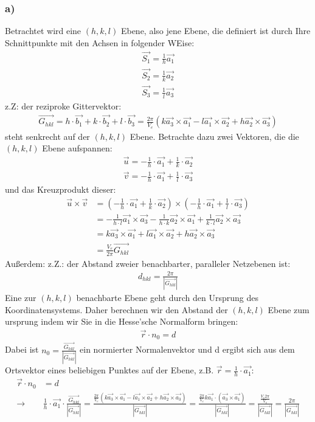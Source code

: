 \documentclass[11pt]{article}
\begin{document}
\subsubsection*{a)}
Betrachtet wird eine $(h,k,l)$ Ebene, also jene Ebene, die definiert ist durch Ihre Schnittpunkte mit den Achsen in folgender WEise:
\begin{align*}
\vec{S_1}=\frac{1}{h}\vec{a_1}\\
\vec{S_2}=\frac{1}{k}\vec{a_2}\\
\vec{S_3}=\frac{1}{l}\vec{a_3}
\end{align*}
z.Z: der reziproke Gittervektor:
\begin{align*}
\vec{G_{hkl}}=h\cdot\vec{b_1}+k\cdot\vec{b_2}+l\cdot\vec{b_3} = \frac{2\pi}{V_e}(k\vec{a_3}\times\vec{a_1}-l\vec{a_1}\times\vec{a_2}+h\vec{a_2}\times\vec{a_3})
\end{align*}
steht senkrecht auf der $(h,k,l)$ Ebene. Betrachte dazu zwei Vektoren, die die $(h,k,l)$ Ebene aufspannen:
\begin{align*}
\vec{u}=-\frac{1}{h}\cdot\vec{a_1}+\frac{1}{k}\cdot\vec{a_2}\\
\vec{v}=-\frac{1}{h}\cdot\vec{a_1}+\frac{1}{l}\cdot\vec{a_3}
\end{align*}
und das Kreuzprodukt dieser:
\begin{align*}
\vec{u}\times\vec{v} &= (-\frac{1}{h}\cdot\vec{a_1}+\frac{1}{k}\cdot\vec{a_2})\times(-\frac{1}{h}\cdot\vec{a_1}+\frac{1}{l}\cdot\vec{a_3})\\
&= -\frac{1}{h\cdot l}\vec{a_1}\times\vec{a_3}-\frac{1}{h\cdot k}\vec{a_2}\times\vec{a_1}+\frac{1}{k\cdot l}\vec{a_2}\times\vec{a_3}\\
&= k\vec{a_3}\times\vec{a_1}+l\vec{a_1}\times\vec{a_2}+h\vec{a_2}\times\vec{a_3}\\
&= \frac{V_e}{2\pi}\vec{G_{hkl}}
\end{align*}
Außerdem: z.Z.: der Abstand zweier benachbarter, paralleler Netzebenen ist:
\begin{align*}
d_{hkl}=\frac{2\pi}{|\vec{G_{hkl}}|}
\end{align*}
Eine zur $(h,k,l)$ benachbarte Ebene geht durch den Ursprung des Koordinatensystems. Daher berechnen wir den Abstand der $(h,k,l)$ Ebene zum ursprung indem wir Sie in die Hesse'sche Normalform bringen:
\begin{align*}
\vec{r}\cdot n_0 = d
\end{align*}
Dabei ist $n_0 = \frac{\vec{G_{hkl}}}{|\vec{G_{hkl}}|}$ ein normierter Normalenvektor und d ergibt sich aus dem Ortsvektor eines beliebigen Punktes auf der Ebene, z.B. $\vec{r}=\frac{1}{h}\cdot\vec{a_1}$:
\begin{align*}
\vec{r}\cdot n_0 &= d\\
\rightarrow &\frac{1}{h}\cdot\vec{a_1}\cdot\frac{\vec{G_{hkl}}}{|\vec{G_{hkl}}|} = \frac{\frac{2\pi}{V_e}(k\vec{a_3}\times\vec{a_1}-l\vec{a_1}\times\vec{a_2}+h\vec{a_2}\times\vec{a_3})}{|\vec{G_{hkl}}|} = \frac{\frac{2\pi}{V_e}k\vec{a_1}\cdot(\vec{a_3}\times\vec{a_1})}{|\vec{G_{hkl}}|} = \frac{\frac{V_e 2\pi}{V_e}}{|\vec{G_{hkl}}|} =\frac{2\pi}{|\vec{G_{hkl}}|}
\end{align*}
\end{document}
